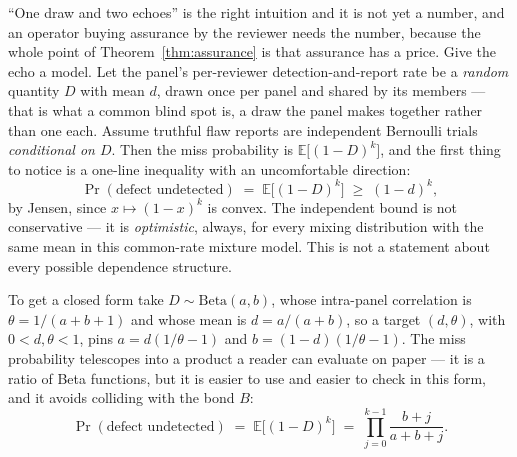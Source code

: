 \documentclass[11pt,a4paper]{article}
\theoremstyle{definition}
\theoremstyle{definition}
\theoremstyle{remark}
\begin{document}
``One draw and two echoes'' is the right intuition and it is not yet a number, and
an operator buying assurance by the reviewer needs the number, because the whole
point of Theorem~\ref{thm:assurance} is that assurance has a price. Give the echo a
model. Let the panel's per-reviewer detection-and-report rate be a \emph{random} quantity $D$
with mean $d$, drawn once per panel and shared by its members --- that is what a
common blind spot is, a draw the panel makes together rather than one each.
Assume truthful flaw reports are independent Bernoulli trials \emph{conditional on $D$}. Then
the miss probability is $\mathbb{E}\bigl[(1-D)^k\bigr]$, and the first thing to
notice is a one-line inequality with an uncomfortable direction:
\begin{equation}\label{eq:assurance-jensen}
\Pr(\text{defect undetected}) \;=\; \mathbb{E}\bigl[(1-D)^k\bigr] \;\ge\; (1-d)^k ,
\end{equation}
by Jensen, since $x \mapsto (1-x)^k$ is convex. The independent bound is not
conservative --- it is \emph{optimistic}, always, for every mixing distribution
with the same mean in this common-rate mixture model. This is not a statement
about every possible dependence structure.

To get a closed form take $D \sim \mathrm{Beta}(a,b)$, whose intra-panel
correlation is $\theta = 1/(a+b+1)$ and whose mean is $d = a/(a+b)$, so a target
$(d,\theta)$, with $0<d,\theta<1$, pins
$a = d(1/\theta - 1)$ and $b = (1-d)(1/\theta - 1)$. The
miss probability telescopes into a product a reader can evaluate on paper --- it is
a ratio of Beta functions, but it is easier to use and easier to check in this
form, and it avoids colliding with the bond $B$:
\begin{equation}\label{eq:assurance-beta}
\Pr(\text{defect undetected})
  \;=\; \mathbb{E}\bigl[(1-D)^k\bigr]
  \;=\; \prod_{j=0}^{k-1}\frac{b+j}{a+b+j}.
\end{equation}
\end{document}
